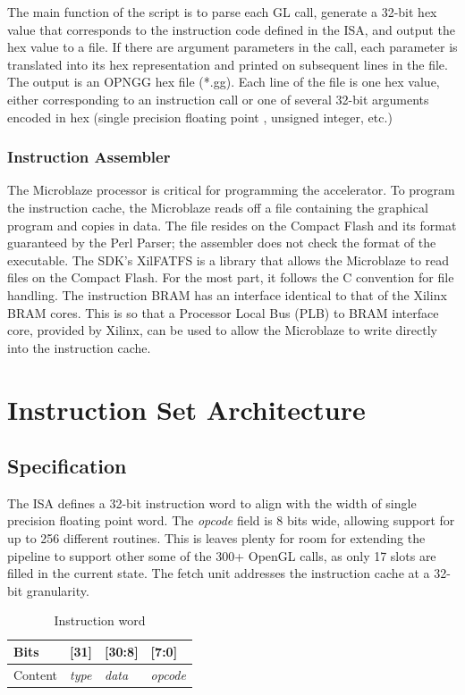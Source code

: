 \documentclass[letterpaper,10pt]{article}
\begin{document}
The main function of the script is to parse each GL call, generate a 32-bit hex value that corresponds to the instruction code defined in the ISA, and output the hex value to a file. If there are argument parameters in the call, each parameter is translated into its hex representation and printed on subsequent lines in the file. The output is an OPNGG hex file (*.gg). Each line of the file is one hex value, either corresponding to an instruction call or one of several 32-bit arguments encoded in hex (single precision floating point , unsigned integer, etc.)

\subsubsection{Instruction Assembler}
The Microblaze processor is critical for programming the accelerator.  To program the instruction cache, the Microblaze reads off a file containing the graphical program and copies in data.  The file resides on the Compact Flash and its format guaranteed by the Perl Parser; the assembler does not check the format of the executable.  The SDK's XilFATFS is a library that allows the Microblaze to read files on the Compact Flash.  For the most part, it follows the C convention for file handling.  The instruction BRAM has an interface identical to that of the Xilinx BRAM cores.  This is so that a Processor Local Bus (PLB) to BRAM interface core, provided by Xilinx, can be used to allow the Microblaze to write directly into the instruction cache.  


\section{Instruction Set Architecture}

\subsection{Specification}

The ISA defines a 32-bit instruction word to align with the width of single precision floating point word. The \emph{opcode} field is 8 bits wide, allowing support for up to 256 different routines. This is leaves plenty for room for extending the pipeline to support other some of the 300+ OpenGL calls, as only 17 slots are filled in the current state. The fetch unit addresses the instruction cache at a 32-bit granularity.

\begin{table}[h]
\begin{center}
\begin{tabular}{ | l | l | l | l |}
\hline
Bits & [31] & [30:8] & [7:0] \\ \hline
Content & \emph{type} & \emph{data} & \emph{opcode} \\ \hline
\end{tabular}
\end{center}
\caption{Instruction word}
\end{table}
\end{document}
